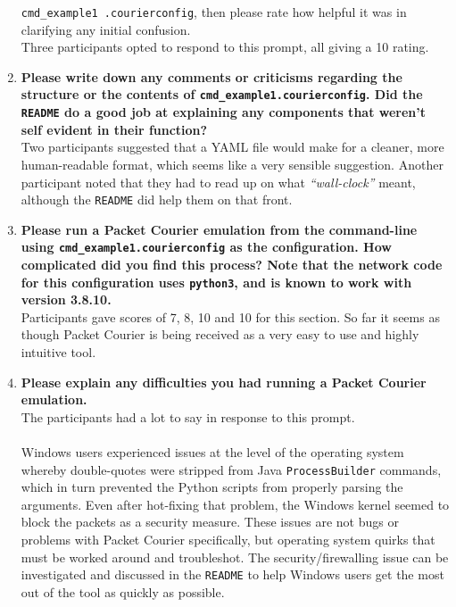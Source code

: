 \begin{enumerate}
{    \texttt{cmd\_example1 .courierconfig}, then please rate how helpful it was in clarifying any initial confusion.} \\
    Three participants opted to respond to this prompt, all giving a 10 rating.
    \item \textbf{Please write down any comments or criticisms regarding the structure or the contents of
    \texttt{cmd\_example1.courierconfig}. Did the \texttt{README} do a good job at explaining any components that
    weren't self
    evident in their function?} \\
    Two participants suggested that a YAML\cite{yaml} file would make for a cleaner, more human-readable format,
    which seems like a very sensible suggestion. Another participant noted that they had to read up on what
    \emph{``wall-clock''} meant, although the \texttt{README} did help them on that front.
    \item \textbf{Please run a Packet Courier emulation from the command-line using
    \texttt{cmd\_example1.courierconfig} as the configuration. How complicated did you find this process? Note that
    the network code for this configuration uses \texttt{python3}, and is known to work with version 3.8.10.} \\
    Participants gave scores of 7, 8, 10 and 10 for this section. So far it seems as though Packet Courier is being
    received as a very easy to use and highly intuitive tool.
    \item \textbf{Please explain any difficulties you had running a Packet Courier emulation.} \\
    The participants had a lot to say in response to this prompt. \\ \\
    Windows users experienced issues at the level of the operating system whereby double-quotes were stripped from
    Java \texttt{ProcessBuilder} commands\cite{java_ProcessBuilder_double_quote_windows,
        microsoft_docs_main_function}, which in turn prevented the Python scripts from properly parsing the
    arguments. Even after hot-fixing that problem, the Windows kernel seemed to block the packets as a security
    measure. These issues are not bugs or problems with Packet Courier specifically, but operating system quirks that
    must be worked around and troubleshot. The security/firewalling issue can be investigated and discussed in the
    \texttt{README} to help Windows users get the most out of the tool as quickly as possible. \\ \\

\end{enumerate}
